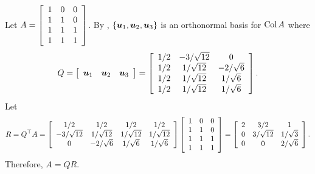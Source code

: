 \begin{Exam} Let $A  = \mtx{ccc}{1&0&0\\1&1&0\\1&1&1\\1&1&1}$. By , $\{\bb u_1, \bb u_2, \bb u_3\}$ is an orthonormal basis for $\col A$ where \[Q = \mtx{ccc}{\bb u_1 & \bb u_2 & \bb u_3} = \mtx{ccc}{1/2&-3/\sqrt{12}&0\\1/2&1/\sqrt{12}&-2/\sqrt{6}\\1/2&1/\sqrt{12}&1/\sqrt{6}\\1/2&1/\sqrt{12}&1/\sqrt{6}}.\] Let \[R = Q^\top A = \mtx{cccc}{1/2 & 1/2&1/2&1/2 \\ -3/\sqrt{12}&1/\sqrt{12}&1/\sqrt{12}&1/\sqrt{12} \\ 0&-2/\sqrt{6}&1/\sqrt{6}&1/\sqrt{6}}\mtx{ccc}{1&0&0\\1&1&0\\1&1&1\\1&1&1} = \mtx{ccc}{2 & 3/2 & 1 \\ 0 & 3/\sqrt{12} & 1/\sqrt{3} \\ 0 & 0 & 2/\sqrt{6}}.\] Therefore, $A = QR$.
\end{Exam}\vs


